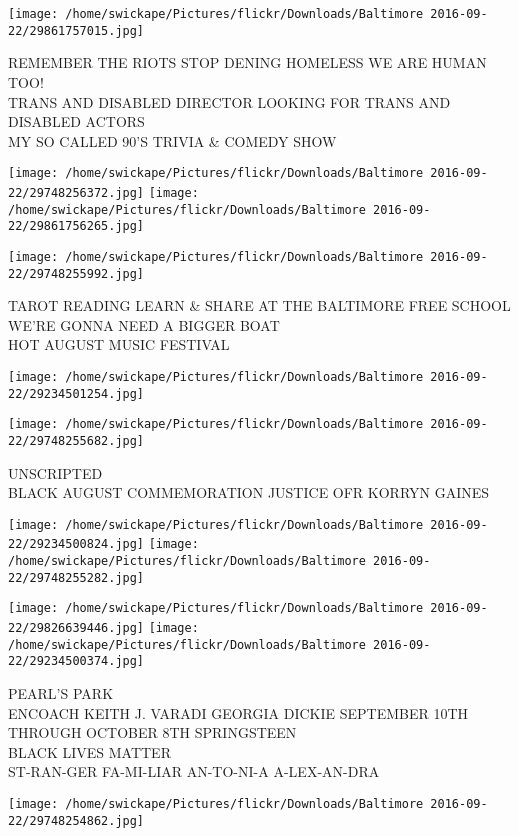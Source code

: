 \documentclass[10pt,letterpaper]{article}
\begin{document}
\vspace{0.25in}
\texttt{[image: /home/swickape/Pictures/flickr/Downloads/Baltimore 2016-09-22/29861757015.jpg]}

REMEMBER THE RIOTS STOP DENING HOMELESS WE ARE HUMAN TOO!\\
TRANS AND DISABLED DIRECTOR LOOKING FOR TRANS AND DISABLED ACTORS\\
MY SO CALLED 90'S TRIVIA \& COMEDY SHOW
\pagebreak

\texttt{[image: /home/swickape/Pictures/flickr/Downloads/Baltimore 2016-09-22/29748256372.jpg]}
\texttt{[image: /home/swickape/Pictures/flickr/Downloads/Baltimore 2016-09-22/29861756265.jpg]}

\texttt{[image: /home/swickape/Pictures/flickr/Downloads/Baltimore 2016-09-22/29748255992.jpg]}

TAROT READING LEARN \& SHARE AT THE BALTIMORE FREE SCHOOL\\
WE'RE GONNA NEED A BIGGER BOAT\\
HOT AUGUST MUSIC FESTIVAL
\pagebreak

\texttt{[image: /home/swickape/Pictures/flickr/Downloads/Baltimore 2016-09-22/29234501254.jpg]}

\vspace{0.25in}
\texttt{[image: /home/swickape/Pictures/flickr/Downloads/Baltimore 2016-09-22/29748255682.jpg]}

UNSCRIPTED\\
BLACK AUGUST COMMEMORATION JUSTICE OFR KORRYN GAINES
\pagebreak

\texttt{[image: /home/swickape/Pictures/flickr/Downloads/Baltimore 2016-09-22/29234500824.jpg]}
\texttt{[image: /home/swickape/Pictures/flickr/Downloads/Baltimore 2016-09-22/29748255282.jpg]}

\texttt{[image: /home/swickape/Pictures/flickr/Downloads/Baltimore 2016-09-22/29826639446.jpg]}
\texttt{[image: /home/swickape/Pictures/flickr/Downloads/Baltimore 2016-09-22/29234500374.jpg]}

PEARL'S PARK\\
ENCOACH KEITH J. VARADI GEORGIA DICKIE SEPTEMBER 10TH THROUGH OCTOBER 8TH SPRINGSTEEN\\
BLACK LIVES MATTER\\
ST{-}RAN{-}GER FA{-}MI{-}LIAR AN{-}TO{-}NI{-}A A{-}LEX{-}AN{-}DRA
\pagebreak

\texttt{[image: /home/swickape/Pictures/flickr/Downloads/Baltimore 2016-09-22/29748254862.jpg]}
\end{document}
